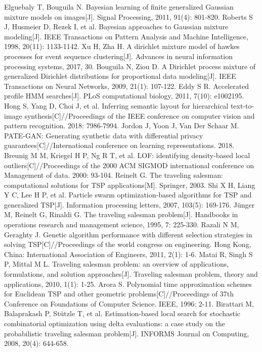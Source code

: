 \documentclass{NauThesis}
\begin{document}
\begin{thebibliography}{99}
Elguebaly T, Bouguila N. Bayesian learning of finite generalized Gaussian mixture models on images[J]. Signal Processing, 2011, 91(4): 801-820.
Roberts S J, Husmeier D, Rezek I, et al. Bayesian approaches to Gaussian mixture modeling[J]. IEEE Transactions on Pattern Analysis and Machine Intelligence, 1998, 20(11): 1133-1142.
Xu H, Zha H. A dirichlet mixture model of hawkes processes for event sequence clustering[J]. Advances in neural information processing systems, 2017, 30.
Bouguila N, Ziou D. A Dirichlet process mixture of generalized Dirichlet distributions for proportional data modeling[J]. IEEE Transactions on Neural Networks, 2009, 21(1): 107-122.
Eddy S R. Accelerated profile HMM searches[J]. PLoS computational biology, 2011, 7(10): e1002195.
Hong S, Yang D, Choi J, et al. Inferring semantic layout for hierarchical text-to-image synthesis[C]//Proceedings of the IEEE conference on computer vision and pattern recognition. 2018: 7986-7994.
Jordon J, Yoon J, Van Der Schaar M. PATE-GAN: Generating synthetic data with differential privacy guarantees[C]//International conference on learning representations. 2018.
Breunig M M, Kriegel H P, Ng R T, et al. LOF: identifying density-based local outliers[C]//Proceedings of the 2000 ACM SIGMOD international conference on Management of data. 2000: 93-104.
Reinelt G. The traveling salesman: computational solutions for TSP applications[M]. Springer, 2003.
Shi X H, Liang Y C, Lee H P, et al. Particle swarm optimization-based algorithms for TSP and generalized TSP[J]. Information processing letters, 2007, 103(5): 169-176.
Jünger M, Reinelt G, Rinaldi G. The traveling salesman problem[J]. Handbooks in operations research and management science, 1995, 7: 225-330.
Razali N M, Geraghty J. Genetic algorithm performance with different selection strategies in solving TSP[C]//Proceedings of the world congress on engineering. Hong Kong, China: International Association of Engineers, 2011, 2(1): 1-6.
Matai R, Singh S P, Mittal M L. Traveling salesman problem: an overview of applications, formulations, and solution approaches[J]. Traveling salesman problem, theory and applications, 2010, 1(1): 1-25.
Arora S. Polynomial time approximation schemes for Euclidean TSP and other geometric problems[C]//Proceedings of 37th Conference on Foundations of Computer Science. IEEE, 1996: 2-11.
Birattari M, Balaprakash P, Stützle T, et al. Estimation-based local search for stochastic combinatorial optimization using delta evaluations: a case study on the probabilistic traveling salesman problem[J]. INFORMS Journal on Computing, 2008, 20(4): 644-658.

\end{thebibliography}
\end{document}
